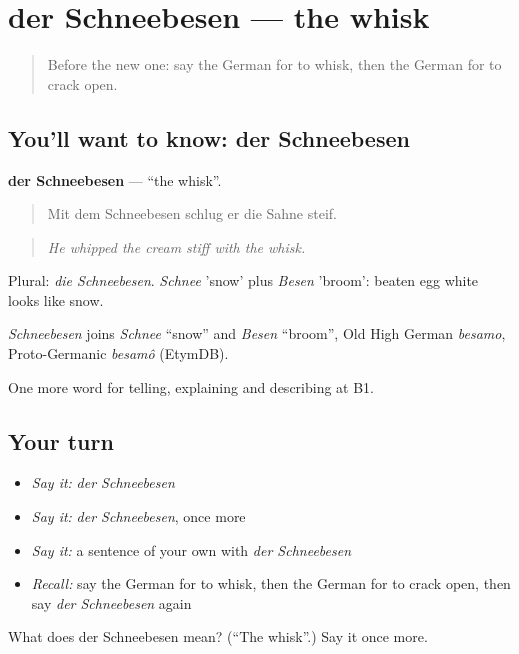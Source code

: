 \section[der Schneebesen]{der Schneebesen — the whisk}

\label{lesson:GE-C324-schneebesen}



\begin{quote}
Before the new one: say the German for to whisk, then the German for to crack open.
\end{quote}

\subsection*{You'll want to know: der Schneebesen}
\textbf{der Schneebesen} — \textquotedblleft{}the whisk\textquotedblright{}.

\begin{quote}
Mit dem Schneebesen schlug er die Sahne steif.
\end{quote}

\begin{quote}
\emph{He whipped the cream stiff with the whisk.}
\end{quote}

Plural: \emph{die Schneebesen}. \emph{Schnee} 'snow' plus \emph{Besen} 'broom': beaten egg white looks like snow.

\begin{cousinweb}
\emph{Schneebesen} joins \emph{Schnee} \textquotedblleft{}snow\textquotedblright{} and \emph{Besen} \textquotedblleft{}broom\textquotedblright{}, Old High German \emph{besamo}, Proto-Germanic \emph{besamô} (EtymDB).
\end{cousinweb}

\begin{grammarlens}[title={What you've built}]
One more word for telling, explaining and describing at B1.
\end{grammarlens}

\subsection*{Your turn}
\begin{itemize}
\raggedright
  \item \emph{Say it:} \emph{der Schneebesen}
  \item \emph{Say it:} \emph{der Schneebesen}, once more
  \item \emph{Say it:} a sentence of your own with \emph{der Schneebesen}
  \item \emph{Recall:} say the German for to whisk, then the German for to crack open, then say \emph{der Schneebesen} again
\end{itemize}

\begin{tcolorbox}[breakable,colback=teal!4,colframe=teal!35!black,title={Before you move on}]
What does der Schneebesen mean? (\textquotedblleft{}The whisk\textquotedblright{}.) Say it once more.
\end{tcolorbox}
